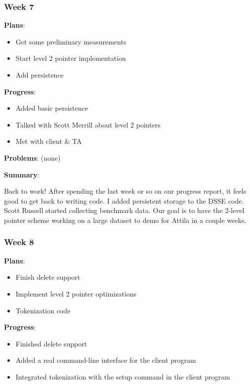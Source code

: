 \subsubsection{Week 7}

\noindent \textbf{Plans}:
\begin{itemize}
\item Get some preliminary measurements 
\item Start level 2 pointer implementation 
\item Add persistence 
\end{itemize}

\noindent \textbf{Progress}:
\begin{itemize}
\item Added basic persistence 
\item Talked with Scott Merrill about level 2 pointers 
\item Met with client \& TA 
\end{itemize}

\noindent \textbf{Problems}:
(none)

\noindent \textbf{Summary}: 

Back to work! After spending the last week or so on our progress report, it feels good to get back to writing code. I added persistent storage to the DSSE code. Scott Russell started collecting benchmark data. Our goal is to have the 2-level pointer scheme working on a large dataset to demo for Attila in a couple weeks. 


\subsubsection{Week 8}

\noindent \textbf{Plans}:
\begin{itemize}
\item Finish delete support 
\item Implement level 2 pointer optimizations 
\item Tokenization code 
\end{itemize}
 

\noindent \textbf{Progress}: 
\begin{itemize}
\item Finished delete support 
\item Added a real command-line interface for the client program 
\item Integrated tokenization with the setup command in the client program 
\end{itemize}
 
